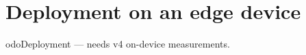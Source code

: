 \section{Deployment on an edge device}\label{sec:deployment}
	odo{Deployment --- needs v4 on-device measurements.}
